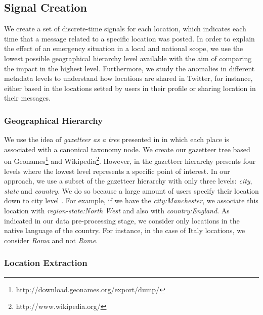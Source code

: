\documentclass[sigconf]{acmart}
\begin{document}
\subsection{Signal Creation}
We create a set of discrete-time signals for each location, which indicates each time that a message related to a specific location was posted. In order to explain the effect of an emergency situation in a local and national scope, we use the lowest possible geographical hierarchy level available with the aim of comparing the impact in the highest level. Furthermore, we study the anomalies in different metadata levels to understand how locations are shared in Twitter, for instance, either based in the locations setted by users in their profile or sharing location in their messages.


\subsubsection{Geographical Hierarchy}\label{sssec:geohie}
We use the idea of \textit{gazetteer as a tree} presented in \cite{yin2014pinpointing} in which each place is associated with a canonical taxonomy node. We create our gazetteer tree based on Geonames\footnote{http://download.geonames.org/export/dump/} and Wikipedia\footnote{http://www.wikipedia.org/}. However, in \cite{yin2014pinpointing} the gazetteer hierarchy presents four levels where the lowest level represents a specific point of interest. In our approach, we use a subset of the gazetteer hierarchy with only three levels: {\em city}, {\em state} and {\em country}. We do so because a large amount of users specify their location down to city level \cite{hecht2011tweets}. For example, if we have the \textit{city:Manchester}, we associate this location with \textit{region-state:North West} and also with \textit{country:England}. As indicated in our data pre-processing stage, we consider only locations in the native language of the country. For instance, in the case of Italy locations, we consider \textit{Roma} and not \textit{Rome}.

\subsubsection{Location Extraction}
\end{document}
